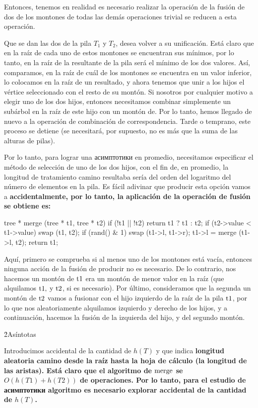 Entonces, tenemos en realidad es necesario realizar la operación de la fusión de dos de los montones de todas las demás operaciones trivial se reducen a esta operación.

Que se dan las dos de la pila $T_1$ y $T_2$, desea volver a su unificación. Está claro que en la raíz de cada uno de estos montones se encuentran sus mínimos, por lo tanto, en la raíz de la resultante de la pila será el mínimo de los dos valores. Así, comparamos, en la raíz de cuál de los montones se encuentra en un valor inferior, lo colocamos en la raíz de un resultado, y ahora tenemos que unir a los hijos el vértice seleccionado con el resto de su montón. Si nosotros por cualquier motivo a elegir uno de los dos hijos, entonces necesitamos combinar simplemente un subárbol en la raíz de este hijo con un montón de. Por lo tanto, hemos llegado de nuevo a la operación de combinación de correspondencia. Tarde o temprano, este proceso se detiene (se necesitará, por supuesto, no es más que la suma de las alturas de pilas).

Por lo tanto, para lograr una асимптотики en promedio, necesitamos especificar el método de selección de uno de los dos hijos, con el fin de, en promedio, la longitud de tratamiento camino resultaba sería del orden del logaritmo del número de elementos en la pila. Es fácil adivinar que producir esta opción vamos a \bf{accidentalmente}, por lo tanto, la aplicación de la operación de fusión se obtiene es:

\code
tree * merge (tree * t1, tree * t2) {
if (!t1 || !t2)
return t1 ? t1 : t2;
if (t2->value < t1->value)
swap (t1, t2);
if (rand() & 1)
swap (t1->l, t1->r);
t1->l = merge (t1->l, t2);
return t1;
}
\endcode

Aquí, primero se comprueba si al menos uno de los montones está vacía, entonces ninguna acción de la fusión de producir no es necesario. De lo contrario, nos hacemos un montón de $\rm t1$ era un montón de menor valor en la raíz (que alquilamos $\rm t1,$ y $\rm t2$, si es necesario). Por último, consideramos que la segunda un montón de $\rm t2$ vamos a fusionar con el hijo izquierdo de la raíz de la pila $\rm t1$, por lo que nos aleatoriamente alquilamos izquierdo y derecho de los hijos, y a continuación, hacemos la fusión de la izquierda del hijo, y del segundo montón.

\h2{Asíntotas}

Introducimos accidental de la cantidad de $h(T)$ y que indica \bf{longitud aleatoria camino} desde la raíz hasta la hoja de cálculo (la longitud de las aristas). Está claro que el algoritmo de $\rm merge$ se $O(h(T1)+h(T2))$ de operaciones. Por lo tanto, para el estudio de асимптотики algoritmo es necesario explorar accidental de la cantidad de $h(T)$.

